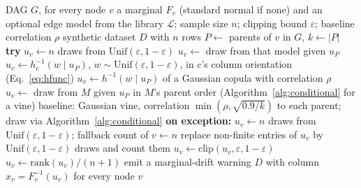 \documentclass[
  english,
  class=report,
  accentcolor=2c,
  marginpar=false,
  parskip=half-,
  fontsize=11pt,
  ruledheaders=false,
  pdfa=false,
  IMRAD=false,
  thesis={type=master}
]{tudapub}
\begin{document}
\begin{algorithm}
\caption{\texttt{GraphSampler}: sampling a dataset for an arbitrary DAG (as implemented in \texttt{GraphSampler.sample})}
\label{alg:sampler}
\begin{algorithmic}[1]
\Require DAG $G$, for every node $v$ a marginal $F_v$ (standard normal if none) and an optional edge model from the library $\mathcal{L}$; sample size $n$; clipping bound $\varepsilon$; baseline correlation $\rho$
\Ensure synthetic dataset $D$ with $n$ rows
  \State $P \gets$ parents of $v$ in $G$, \quad $k \gets |P|$
  \State \textbf{try}
    \State $u_v \gets n$ draws from $\text{Unif}(\varepsilon, 1-\varepsilon)$
     
      \State $u_v \gets$ draw from that model given $u_P$
      \State $u_v \gets h_c^{-1}(w \mid u_P)$, $w \sim \text{Unif}(\varepsilon,1-\varepsilon)$, in $c$'s column orientation (Eq.~\ref{eq:hfunc})
    \Else
      \State $u_v \gets h^{-1}(w \mid u_P)$ of a Gaussian copula with correlation $\rho$ 
    \EndIf
  \Else
     
      \State $u_v \gets$ draw from $M$ given $u_P$ in $M$'s parent order (Algorithm~\ref{alg:conditional} for a vine)
    \Else
      \State baseline: Gaussian vine, correlation $\min(\rho, \sqrt{0.9/k})$ to each parent; draw via Algorithm~\ref{alg:conditional}
    \EndIf
  \EndIf
  \State \textbf{on exception:} $u_v \gets n$ draws from $\text{Unif}(\varepsilon,1-\varepsilon)$; fallback count of $v \gets n$
  \State replace non-finite entries of $u_v$ by $\text{Unif}(\varepsilon,1-\varepsilon)$ draws and count them
  \State $u_v \gets \text{clip}(u_v, \varepsilon, 1-\varepsilon)$
     \State $u_v \gets \text{rank}(u_v)/(n+1)$
     \State emit a marginal-drift warning
    \EndIf
  \EndIf
\EndFor
\State \Return $D$ with column $x_v = F_v^{-1}(u_v)$ for every node $v$
\end{algorithmic}
\end{algorithm}
\end{document}
